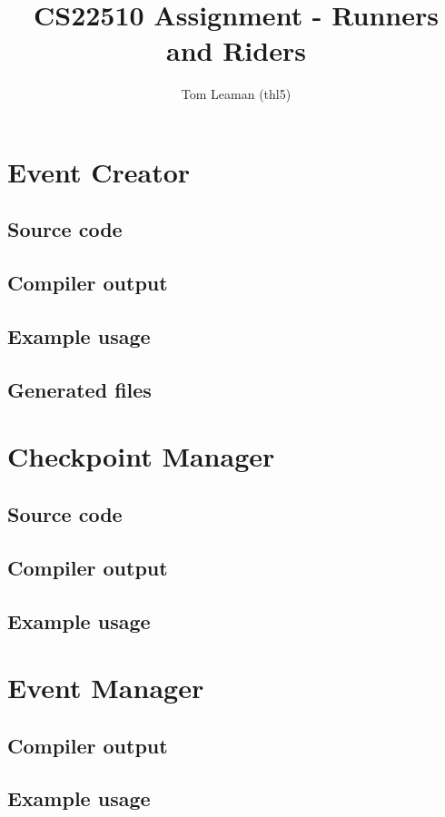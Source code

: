 \documentclass[a4paper, twoside]{article}
\title{CS22510 Assignment - Runners and Riders}
\author{Tom Leaman (thl5)}
\begin{document}
\maketitle
\newpage
\tableofcontents
\newpage

\section{Event Creator}
\subsection{Source code}
\subsection{Compiler output}
\subsection{Example usage}
\subsection{Generated files}

\section{Checkpoint Manager}
\subsection{Source code}
\subsection{Compiler output}
\subsection{Example usage}

\section{Event Manager}
\subsection{Compiler output}
\subsection{Example usage}
\end{document}
